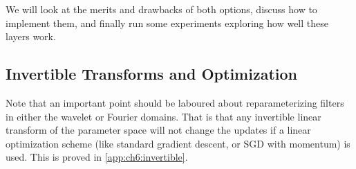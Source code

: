 We will look at the merits and drawbacks of both options, discuss how to
implement them, and finally run some experiments exploring how well these
layers work.

\subsection{Invertible Transforms and Optimization}
Note that an important point should be laboured about reparameterizing filters
in either the wavelet or Fourier domains. That is that any invertible linear
transform of the parameter space will not change the updates if a linear
optimization scheme (like standard gradient descent, or SGD with momentum) is
used. This is proved in \autoref{app:ch6:invertible}.






